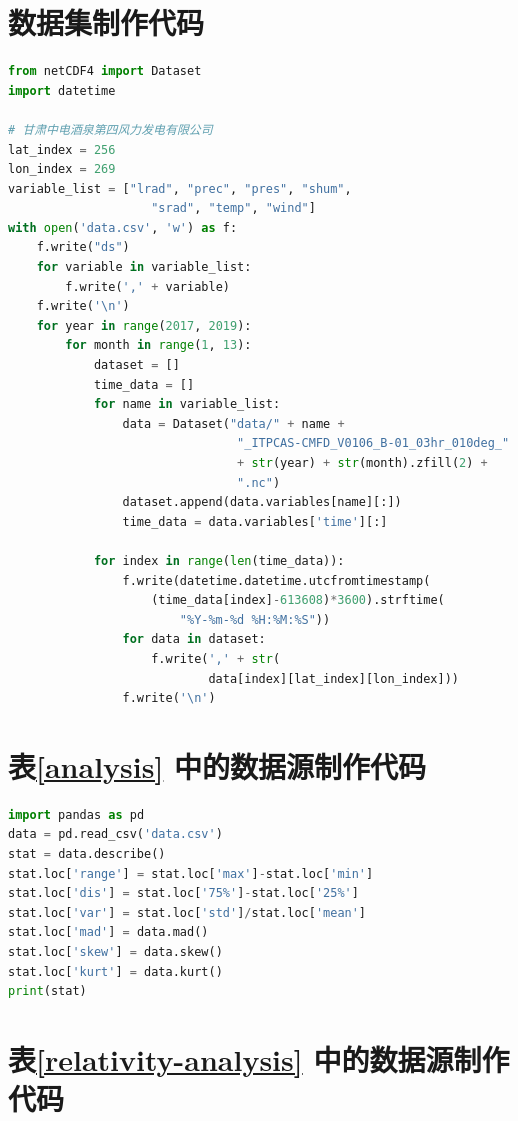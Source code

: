 \documentclass[AutoFakeBold]{LZUThesis}
\begin{document}
\Appendix

\section{数据集制作代码}

\begin{lstlisting}[language = python]
from netCDF4 import Dataset
import datetime

# 甘肃中电酒泉第四风力发电有限公司
lat_index = 256
lon_index = 269
variable_list = ["lrad", "prec", "pres", "shum",
                    "srad", "temp", "wind"]
with open('data.csv', 'w') as f:
    f.write("ds")
    for variable in variable_list:
        f.write(',' + variable)
    f.write('\n')
    for year in range(2017, 2019):
        for month in range(1, 13):
            dataset = []
            time_data = []
            for name in variable_list:
                data = Dataset("data/" + name + 
                                "_ITPCAS-CMFD_V0106_B-01_03hr_010deg_"
                                + str(year) + str(month).zfill(2) +
                                ".nc")
                dataset.append(data.variables[name][:])
                time_data = data.variables['time'][:]

            for index in range(len(time_data)):
                f.write(datetime.datetime.utcfromtimestamp(
                    (time_data[index]-613608)*3600).strftime(
                        "%Y-%m-%d %H:%M:%S"))
                for data in dataset:
                    f.write(',' + str(
                            data[index][lat_index][lon_index]))
                f.write('\n')
\end{lstlisting}

\section{表\ref{analysis} 中的数据源制作代码}

\begin{lstlisting}[language = python]
import pandas as pd
data = pd.read_csv('data.csv')
stat = data.describe()
stat.loc['range'] = stat.loc['max']-stat.loc['min']
stat.loc['dis'] = stat.loc['75%']-stat.loc['25%']
stat.loc['var'] = stat.loc['std']/stat.loc['mean']
stat.loc['mad'] = data.mad()
stat.loc['skew'] = data.skew()
stat.loc['kurt'] = data.kurt()
print(stat)
\end{lstlisting}

\section{表\ref{relativity-analysis} 中的数据源制作代码}
\end{document}
